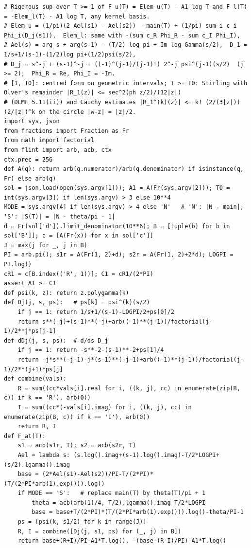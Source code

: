 \documentclass[11pt,reqno]{amsart}
\numberwithin{equation}{section}
\theoremstyle{definition}
\theoremstyle{remark}
\begin{document}
\begin{lstlisting}
# Rigorous sup over T >= 1 of F_u(T) = Elem_u(T) - A1 log T and F_l(T) = -Elem_l(T) - A1 log T, any kernel basis.
# Elem_u = (1/pi)(2 Ael(s1) - Ael(s2)) - main(T) + (1/pi) sum_i c_i Phi_i(D_j(s1)),  Elem_l: same with -(sum c_R Phi_R - sum c_I Phi_I),
# Ael(s) = arg s + arg(s-1) - (T/2) log pi + Im log Gamma(s/2),  D_1 = 1/s+1/(s-1)-(1/2)log pi+(1/2)psi(s/2),
# D_j = s^-j + (s-1)^-j + ((-1)^(j-1)/(j-1)!) 2^-j psi^(j-1)(s/2)  (j >= 2);  Phi_R = Re, Phi_I = -Im.
# [1, T0]: centred form on geometric intervals; T >= T0: Stirling with Olver's remainder |R_1(z)| <= sec^2(ph z/2)/(12|z|)
# (DLMF 5.11(ii)) and Cauchy estimates |R_1^(k)(z)| <= k! (2/(3|z|)) (2/|z|)^k on the circle |w-z| = |z|/2.
import sys, json
from fractions import Fraction as Fr
from math import factorial
from flint import arb, acb, ctx
ctx.prec = 256
def A(q): return arb(q.numerator)/arb(q.denominator) if isinstance(q, Fr) else arb(q)
sol = json.load(open(sys.argv[1])); A1 = A(Fr(sys.argv[2])); T0 = int(sys.argv[3]) if len(sys.argv) > 3 else 10**4
MODE = sys.argv[4] if len(sys.argv) > 4 else 'N'   # 'N': |N - main|;  'S': |S(T)| = |N - theta/pi - 1|
d = Fr(sol['d']).limit_denominator(10**6); B = [tuple(b) for b in sol['B']]; c = [A(Fr(x)) for x in sol['c']]
J = max(j for _, j in B)
PI = arb.pi(); s1r = A(Fr(1, 2)+d); s2r = A(Fr(1, 2)+2*d); LOGPI = PI.log()
cR1 = c[B.index(('R', 1))]; C1 = cR1/(2*PI)
assert A1 >= C1
def psi(k, z): return z.polygamma(k)
def Dj(j, s, ps):   # ps[k] = psi^(k)(s/2)
    if j == 1: return 1/s+1/(s-1)-LOGPI/2+ps[0]/2
    return s**(-j)+(s-1)**(-j)+arb((-1)**(j-1))/factorial(j-1)/2**j*ps[j-1]
def dDj(j, s, ps):  # d/ds D_j
    if j == 1: return -s**-2-(s-1)**-2+ps[1]/4
    return -j*s**(-j-1)-j*(s-1)**(-j-1)+arb((-1)**(j-1))/factorial(j-1)/2**(j+1)*ps[j]
def combine(vals):
    R = sum((cc*vals[i].real for i, ((k, j), cc) in enumerate(zip(B, c)) if k == 'R'), arb(0))
    I = sum((cc*(-vals[i].imag) for i, ((k, j), cc) in enumerate(zip(B, c)) if k == 'I'), arb(0))
    return R, I
def F_at(T):
    s1 = acb(s1r, T); s2 = acb(s2r, T)
    Ael = lambda s: (s.log().imag+(s-1).log().imag)-T/2*LOGPI+(s/2).lgamma().imag
    base = (2*Ael(s1)-Ael(s2))/PI-T/(2*PI)*(T/(2*PI*arb(1).exp())).log()
    if MODE == 'S':   # replace main(T) by theta(T)/pi + 1
        theta = acb(arb(1)/4, T/2).lgamma().imag-T/2*LOGPI
        base = base+T/(2*PI)*(T/(2*PI*arb(1).exp())).log()-theta/PI-1
    ps = [psi(k, s1/2) for k in range(J)]
    R, I = combine([Dj(j, s1, ps) for (_, j) in B])
    return base+(R+I)/PI-A1*T.log(), -(base-(R-I)/PI)-A1*T.log()

\end{lstlisting}
\end{document}

